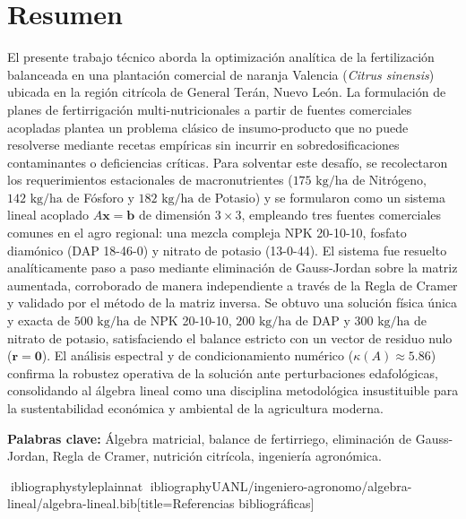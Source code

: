\documentclass[spanish,letterpaper,oneside]{article}
\begin{document}
\hypersetup{pageanchor=false}
\templatePortrait
\clearpage
\hypersetup{pageanchor=true}
\templatePagecfg

\section*{Resumen}
El presente trabajo técnico aborda la optimización analítica de la fertilización balanceada en una plantación comercial de naranja Valencia (\textit{Citrus sinensis}) ubicada en la región citrícola de General Terán, Nuevo León. La formulación de planes de fertirrigación multi-nutricionales a partir de fuentes comerciales acopladas plantea un problema clásico de insumo-producto que no puede resolverse mediante recetas empíricas sin incurrir en sobredosificaciones contaminantes o deficiencias críticas. Para solventar este desafío, se recolectaron los requerimientos estacionales de macronutrientes ($175\text{ kg/ha}$ de Nitrógeno, $142\text{ kg/ha}$ de Fósforo y $182\text{ kg/ha}$ de Potasio) y se formularon como un sistema lineal acoplado $A\mathbf{x} = \mathbf{b}$ de dimensión $3 \times 3$, empleando tres fuentes comerciales comunes en el agro regional: una mezcla compleja NPK 20-10-10, fosfato diamónico (DAP 18-46-0) y nitrato de potasio (13-0-44). El sistema fue resuelto analíticamente paso a paso mediante eliminación de Gauss-Jordan sobre la matriz aumentada, corroborado de manera independiente a través de la Regla de Cramer y validado por el método de la matriz inversa. Se obtuvo una solución física única y exacta de $500\text{ kg/ha}$ de NPK 20-10-10, $200\text{ kg/ha}$ de DAP y $300\text{ kg/ha}$ de nitrato de potasio, satisfaciendo el balance estricto con un vector de residuo nulo ($\mathbf{r} = \mathbf{0}$). El análisis espectral y de condicionamiento numérico ($\kappa(A) \approx 5.86$) confirma la robustez operativa de la solución ante perturbaciones edafológicas, consolidando al álgebra lineal como una disciplina metodológica insustituible para la sustentabilidad económica y ambiental de la agricultura moderna.

\vspace{0.35cm}
\noindent\textbf{Palabras clave:} Álgebra matricial, balance de fertirriego, eliminación de Gauss-Jordan, Regla de Cramer, nutrición citrícola, ingeniería agronómica.

\clearpage
\templateIndex
\clearpage
\templateFinalcfg
\onehalfspacing


\clearpage
ibliographystyle{plainnat}
ibliography{UANL/ingeniero-agronomo/algebra-lineal/algebra-lineal.bib}[title={Referencias bibliográficas}]
\end{document}
